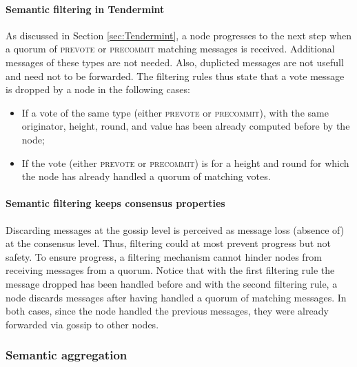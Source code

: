 \paragraph{Semantic filtering in Tendermint} 
As discussed  in Section \ref{sec:Tendermint}, a node progresses   to the next step when a quorum of \textsc{prevote} or \textsc{precommit} matching messages is received.  Additional messages of these types are not needed.  Also, duplicted messages are not usefull and need not to be forwarded.   The filtering rules thus state that a vote message is dropped by a node in the following cases:  
\begin{itemize}
\item If a vote of the same type (either \textsc{prevote} or \textsc{precommit}), with the same originator,  height, round, and value has been already computed before by the node;
\item If the vote (either \textsc{prevote} or \textsc{precommit}) is for a height and round for which the node has already handled a quorum of matching votes.
\end{itemize}

\paragraph{Semantic filtering keeps consensus properties}

Discarding messages at the gossip level is perceived as message loss (absence of) at the consensus level.  Thus, filtering could at most prevent progress but not safety.
To ensure progress, a filtering mechanism cannot hinder nodes from receiving messages from a quorum. 
%
Notice that with the first filtering rule the message dropped has been handled before and
with the second filtering rule, a node discards messages after having handled a quorum of matching messages.   In both cases, since the node handled the previous messages, they were already forwarded via gossip to other nodes.  




\subsubsection{Semantic aggregation}

